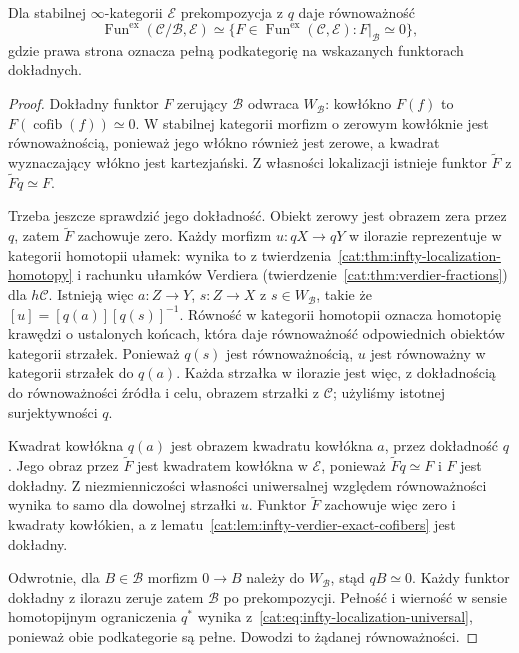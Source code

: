 \begin{stwierdzenie}\label{cat:prop:infty-verdier-universal}
Dla stabilnej $\infty$-kategorii $\mathcal E$ prekompozycja z $q$ daje równoważność
\[
 \operatorname{Fun}^{\mathrm{ex}}(\mathcal C/\mathcal B,\mathcal E)
 \simeq
 \{F\in\operatorname{Fun}^{\mathrm{ex}}(\mathcal C,\mathcal E):
       F|_{\mathcal B}\simeq0\},
\]
gdzie prawa strona oznacza pełną podkategorię na wskazanych funktorach dokładnych.
\end{stwierdzenie}
\begin{proof}
Dokładny funktor $F$ zerujący $\mathcal B$ odwraca $W_{\mathcal B}$: kowłókno $F(f)$ to $F(\operatorname{cofib}(f))\simeq0$. W stabilnej kategorii morfizm o zerowym kowłóknie jest równoważnością, ponieważ jego włókno również jest zerowe, a kwadrat wyznaczający włókno jest kartezjański. Z własności lokalizacji istnieje funktor $\widetilde F$ z $\widetilde Fq\simeq F$.

Trzeba jeszcze sprawdzić jego dokładność. Obiekt zerowy jest obrazem zera przez $q$, zatem $\widetilde F$ zachowuje zero. Każdy morfizm $u:qX\to qY$ w ilorazie reprezentuje w kategorii homotopii ułamek: wynika to z twierdzenia~\ref{cat:thm:infty-localization-homotopy} i rachunku ułamków Verdiera (twierdzenie~\ref{cat:thm:verdier-fractions}) dla $h\mathcal C$. Istnieją więc $a:Z\to Y$, $s:Z\to X$ z $s\in W_{\mathcal B}$, takie że $[u]=[q(a)][q(s)]^{-1}$. Równość w kategorii homotopii oznacza homotopię krawędzi o ustalonych końcach, która daje równoważność odpowiednich obiektów kategorii strzałek. Ponieważ $q(s)$ jest równoważnością, $u$ jest równoważny w kategorii strzałek do $q(a)$. Każda strzałka w ilorazie jest więc, z dokładnością do równoważności źródła i celu, obrazem strzałki z $\mathcal C$; użyliśmy istotnej surjektywności $q$.

Kwadrat kowłókna $q(a)$ jest obrazem kwadratu kowłókna $a$, przez dokładność $q$. Jego obraz przez $\widetilde F$ jest kwadratem kowłókna w $\mathcal E$, ponieważ $\widetilde Fq\simeq F$ i $F$ jest dokładny. Z niezmienniczości własności uniwersalnej względem równoważności wynika to samo dla dowolnej strzałki $u$. Funktor $\widetilde F$ zachowuje więc zero i kwadraty kowłókien, a z lematu~\ref{cat:lem:infty-verdier-exact-cofibers} jest dokładny.

Odwrotnie, dla $B\in\mathcal B$ morfizm $0\to B$ należy do $W_{\mathcal B}$, stąd $qB\simeq0$. Każdy funktor dokładny z ilorazu zeruje zatem $\mathcal B$ po prekompozycji. Pełność i wierność w sensie homotopijnym ograniczenia $q^*$ wynika z~\eqref{cat:eq:infty-localization-universal}, ponieważ obie podkategorie są pełne. Dowodzi to żądanej równoważności.
\end{proof}

